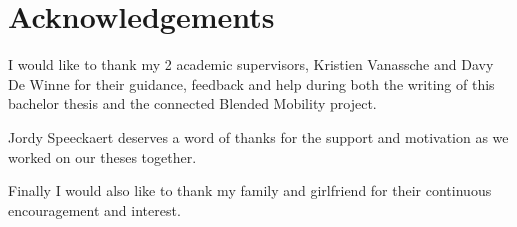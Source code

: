 \chapter*{Acknowledgements}

I would like to thank my 2 academic supervisors, Kristien Vanassche and Davy De Winne for their guidance, feedback and help during both the writing of this bachelor thesis and the connected Blended Mobility project.

Jordy Speeckaert deserves a word of thanks for the support and motivation as we worked on our theses together.

Finally I would also like to thank my family and girlfriend for their continuous encouragement and interest.